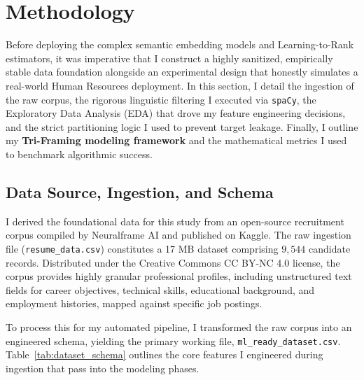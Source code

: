 \chapter{Methodology}
\label{ch:methodology}

Before deploying the complex semantic embedding models and Learning-to-Rank estimators, it was imperative that I construct a highly sanitized, empirically stable data foundation alongside an experimental design that honestly simulates a real-world Human Resources deployment. In this section, I detail the ingestion of the raw corpus, the rigorous linguistic filtering I executed via \texttt{spaCy}, the Exploratory Data Analysis (EDA) that drove my feature engineering decisions, and the strict partitioning logic I used to prevent target leakage. Finally, I outline my \textbf{Tri-Framing modeling framework} and the mathematical metrics I used to benchmark algorithmic success.

\section{Data Source, Ingestion, and Schema}
\label{sec:data_source}

I derived the foundational data for this study from an open-source recruitment corpus compiled by Neuralframe AI and published on Kaggle. The raw ingestion file (\texttt{resume\_data.csv}) constitutes a 17 MB dataset comprising $9{,}544$ candidate records. Distributed under the Creative Commons CC BY-NC 4.0 license, the corpus provides highly granular professional profiles, including unstructured text fields for career objectives, technical skills, educational background, and employment histories, mapped against specific job postings.

To process this for my automated pipeline, I transformed the raw corpus into an engineered schema, yielding the primary working file, \texttt{ml\_ready\_dataset.csv}. Table~\ref{tab:dataset_schema} outlines the core features I engineered during ingestion that pass into the modeling phases.

